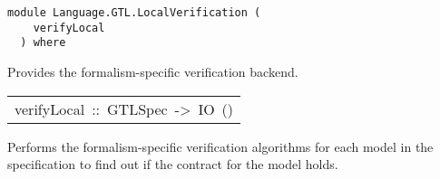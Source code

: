 \label{module:Language.GTL.LocalVerification}
\haddockbeginheader
{\haddockverb\begin{verbatim}
module Language.GTL.LocalVerification (
    verifyLocal
  ) where\end{verbatim}}
\haddockendheader

Provides the formalism-specific verification backend.
\par

\begin{haddockdesc}
\item[\begin{tabular}{@{}l}
verifyLocal\ ::\ GTLSpec\ ->\ IO\ ()
\end{tabular}]\haddockbegindoc
Performs the formalism-specific verification algorithms for each model
   in the specification to find out if the contract for the model holds.
\par

\end{haddockdesc}